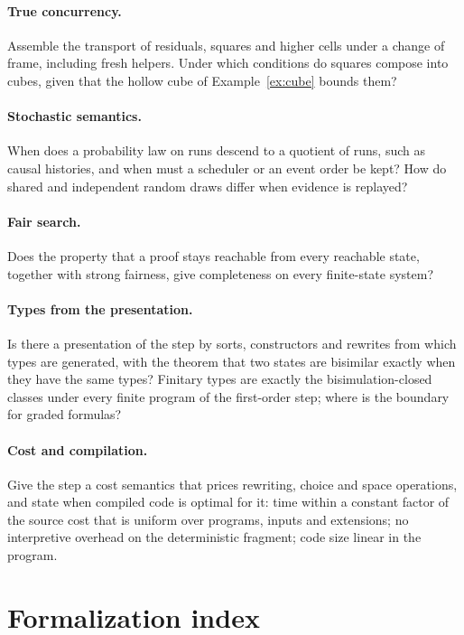 \documentclass[11pt]{article}
\theoremstyle{plain}
\theoremstyle{definition}
\theoremstyle{remark}
\begin{document}
\paragraph{True concurrency.} Assemble the transport of residuals, squares and higher cells under
a change of frame, including fresh helpers. Under which conditions do squares compose into cubes,
given that the hollow cube of Example~\ref{ex:cube} bounds them?

\paragraph{Stochastic semantics.} When does a probability law on runs descend to a quotient of
runs, such as causal histories, and when must a scheduler or an event order be kept? How do
shared and independent random draws differ when evidence is replayed?

\paragraph{Fair search.} Does the property that a proof stays reachable from every reachable state,
together with strong fairness, give completeness on every finite-state system?

\paragraph{Types from the presentation.} Is there a presentation of the step by sorts,
constructors and rewrites from which types are generated, with the theorem that two states are
bisimilar exactly when they have the same types? Finitary types are exactly the
bisimulation-closed classes under every finite program of the first-order step; where is the
boundary for graded formulas?

\paragraph{Cost and compilation.} Give the step a cost semantics that prices rewriting, choice
and space operations, and state when compiled code is optimal for it: time within a constant
factor of the source cost that is uniform over programs, inputs and extensions; no interpretive
overhead on the deterministic fragment; code size linear in the program.

\section{Formalization index}\label{app:index}
\end{document}
